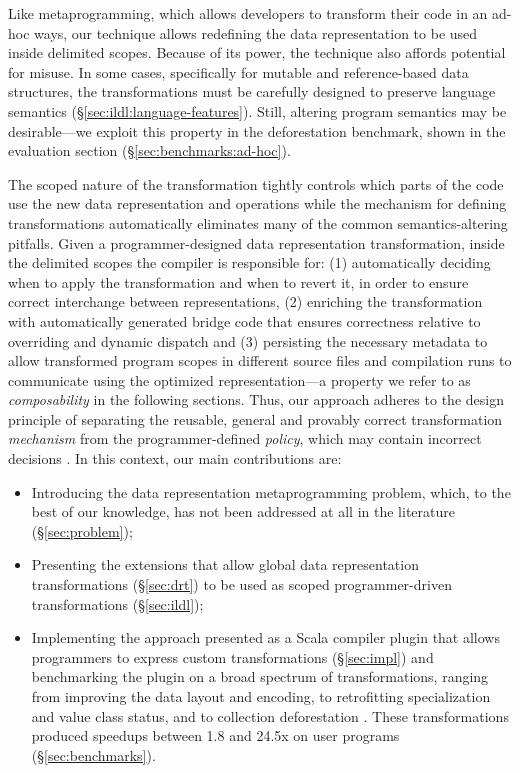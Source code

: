 Like metaprogramming, which allows developers to transform their code in an ad-hoc ways, our technique allows redefining the data representation to be used inside delimited scopes. Because of its power, the technique also affords potential for misuse. In some cases, specifically for mutable and reference-based data structures, the transformations must be carefully designed to preserve language semantics
(\S\ref{sec:ildl:language-features}). Still, altering program semantics may be desirable---we exploit this property in the deforestation benchmark, shown in the evaluation section (\S\ref{sec:benchmarks:ad-hoc}).

The scoped nature of the transformation tightly controls which parts of the code use the new data representation and operations while the mechanism for defining transformations automatically eliminates
many of the common semantics-altering pitfalls. Given a programmer-designed data representation transformation, inside the delimited scopes the compiler is responsible for: (1) automatically deciding when to apply the transformation and when to revert it, in order to ensure correct interchange between representations, (2) enriching the transformation with automatically generated bridge code that ensures correctness relative to overriding and dynamic dispatch and (3) persisting the necessary metadata to allow transformed program scopes in different source files and compilation runs to communicate using the optimized representation---a property we refer to as \emph{composability} in the following sections. Thus, our approach adheres to the design principle of separating the reusable, general and provably correct transformation \emph{mechanism} from the programmer-defined \emph{policy}, which may contain incorrect decisions \cite{lampson-mechanism-policy}. In this context, our main contributions are:
\vspace{0.25em}
\begin{itemize}
  \item Introducing the data representation metaprogramming problem, which, to the best of our knowledge, has not been addressed at all in the literature (\S\ref{sec:problem});
  \item Presenting the extensions that allow global data representation transformations (\S\ref{sec:drt}) to be used as scoped programmer-driven transformations (\S\ref{sec:ildl});
  \item Implementing the approach presented as a Scala compiler plugin \cite{ildl-plugin} that allows programmers to express custom transformations (\S\ref{sec:impl}) and benchmarking the plugin on a broad spectrum of transformations, ranging from improving the data layout and encoding, to retrofitting specialization and value class status, and to collection deforestation \cite{wadler-deforestation}. These transformations produced  speedups between 1.8 and 24.5x on user programs (\S\ref{sec:benchmarks}).
\end{itemize}
